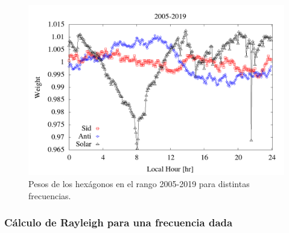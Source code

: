         \begin{figure}[H]
          \centering
              \includegraphics[width=0.85\linewidth]{../report_2_27_04_2020/Graficos/weigth2005-2019.png}
              \caption{Pesos de los hexágonos en el rango 2005-2019 para distintas frecuencias.}
              \label{fig:pesos_ejemplo}
        \end{figure}

  \subsubsection{Cálculo de Rayleigh para una frecuencia dada}

